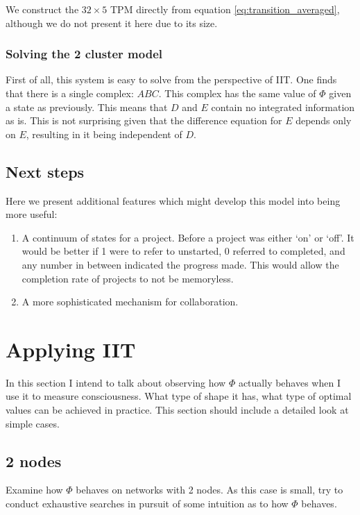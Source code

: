 We construct the $32\times5$ TPM directly from equation \ref{eq:transition_averaged}, although we do not present it here due to its size.




\subsubsection{Solving the 2 cluster model}
First of all, this system is easy to solve from the perspective of IIT. One finds that there is a single complex: $ABC$. This complex has the same value of $\Phi$ given a state as previously. This means that $D$ and $E$ contain no integrated information as is. This is not surprising given that the difference equation for $E$ depends only on $E$, resulting in it being independent of $D$.


\subsection{Next steps}

Here we present additional features which might develop this model into being more useful:

\begin{enumerate}
	\item A continuum of states for a project. Before a project was either `on' or `off'. It would be better if 1 were to refer to unstarted, 0 referred to completed, and any number in between indicated the progress made. This would allow the completion rate of projects to not be memoryless.
	\item A more sophisticated mechanism for collaboration. 
\end{enumerate}



\section{Applying IIT}
In this section I intend to talk about observing how $\Phi$ actually behaves when I use it to measure consciousness. What type of shape it has, what type of optimal values can be achieved in practice. This section should include a detailed look at simple cases.

\subsection{2 nodes}
Examine how $\Phi$ behaves on networks with 2 nodes. As this case is small, try to conduct exhaustive searches in pursuit of some intuition as to how $\Phi$ behaves.
